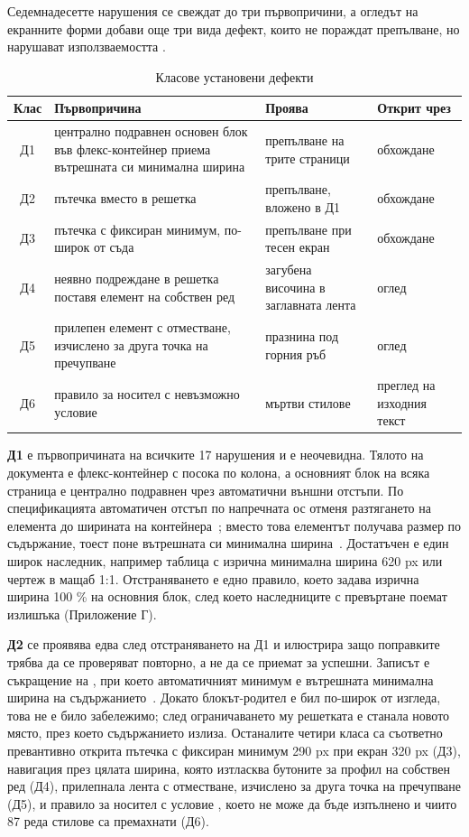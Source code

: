 Седемнадесетте нарушения се свеждат до три първопричини, а огледът на екранните форми
добави още три вида дефект, които не пораждат препълване, но нарушават използваемостта
.

\begin{table}[htbp]
\centering
\caption{Класове установени дефекти}
\label{tab:taxonomy}
{\fontsize{10}{12}\selectfont
\begin{tabular}{@{}cL{5.0cm}L{3.1cm}L{2.6cm}@{}}
\toprule
\textbf{Клас} & \textbf{Първопричина} & \textbf{Проява} & \textbf{Открит чрез} \\
\midrule
Д1 & централно подравнен основен блок във флекс-контейнер приема вътрешната си минимална ширина & препълване на трите страници & обхождане \\
Д2 & пътечка  вместо  в решетка & препълване, вложено в Д1 & обхождане \\
Д3 & пътечка с фиксиран минимум, по-широк от съда & препълване при тесен екран & обхождане \\
Д4 & неявно подреждане в решетка поставя елемент на собствен ред & загубена височина в заглавната лента & оглед \\
Д5 & прилепен елемент с отместване, изчислено за друга точка на пречупване & празнина под горния ръб & оглед \\
Д6 & правило за носител с невъзможно условие & мъртви стилове & преглед на изходния текст \\
\bottomrule
\end{tabular}}
\end{table}

\textbf{Д1} е първопричината на всичките 17 нарушения и е неочевидна. Тялото на
документа е флекс-контейнер с посока по колона, а основният блок на всяка страница е
централно подравнен чрез автоматични външни отстъпи. По спецификацията автоматичен
отстъп по напречната ос отменя разтягането на елемента до ширината на
контейнера~\cite{css_flexbox1}; вместо това елементът получава размер по съдържание,
тоест поне вътрешната си минимална ширина~\cite{css_sizing3}. Достатъчен е един широк
наследник, например таблица с изрична минимална ширина 620 px или чертеж в мащаб 1:1.
Отстраняването е едно правило, което задава изрична ширина 100 \% на основния блок, след
което наследниците с превъртане поемат излишъка (Приложение Г).

\textbf{Д2} се проявява едва след отстраняването на Д1 и илюстрира защо поправките
трябва да се проверяват повторно, а не да се приемат за успешни. Записът  е
съкращение на , при което автоматичният минимум е вътрешната
минимална ширина на съдържанието~\cite{mdn_grid}. Докато блокът-родител е бил по-широк
от изгледа, това не е било забележимо; след ограничаването му решетката е станала новото
място, през което съдържанието излиза. Останалите четири класа са съответно превантивно
открита пътечка с фиксиран минимум 290 px при екран 320 px (Д3), навигация през цялата
ширина, която изтласква бутоните за профил на собствен ред (Д4), прилепнала лента с
отместване, изчислено за друга точка на пречупване (Д5), и правило за носител с условие
, което не може да бъде изпълнено и
чиито 87 реда стилове са премахнати (Д6).

